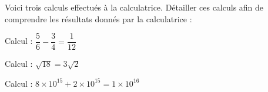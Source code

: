 
\bigskip
 
Voici trois calculs effectués à la calculatrice. Détailler ces calculs afin de comprendre les résultats donnés par la calculatrice : 

\smallskip
 
Calcul  : $\dfrac{5}{6} - \dfrac{3}{4} = \dfrac{1}{12}$
 
\smallskip

Calcul  : $\sqrt{18} = 3\sqrt{2}$

\smallskip
 
Calcul  : $8 \times 10^{15} + 2 \times 10^{15} = 1 \times 10^{16}$

\bigskip
 
